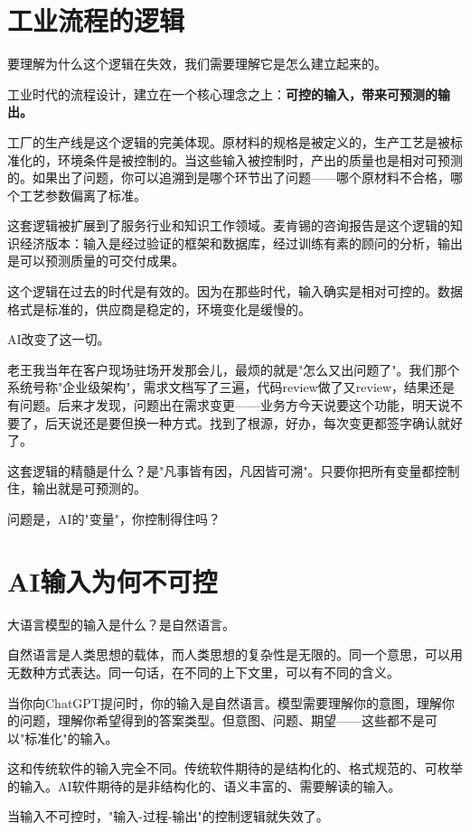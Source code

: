 \section{工业流程的逻辑}


要理解为什么这个逻辑在失效，我们需要理解它是怎么建立起来的。

工业时代的流程设计，建立在一个核心理念之上：\textbf{可控的输入，带来可预测的输出。}

工厂的生产线是这个逻辑的完美体现。原材料的规格是被定义的，生产工艺是被标准化的，环境条件是被控制的。当这些输入被控制时，产出的质量也是相对可预测的。如果出了问题，你可以追溯到是哪个环节出了问题——哪个原材料不合格，哪个工艺参数偏离了标准。

这套逻辑被扩展到了服务行业和知识工作领域。麦肯锡的咨询报告是这个逻辑的知识经济版本：输入是经过验证的框架和数据库，经过训练有素的顾问的分析，输出是可以预测质量的可交付成果。

这个逻辑在过去的时代是有效的。因为在那些时代，输入确实是相对可控的。数据格式是标准的，供应商是稳定的，环境变化是缓慢的。

AI改变了这一切。

老王我当年在客户现场驻场开发那会儿，最烦的就是"怎么又出问题了"。我们那个系统号称"企业级架构"，需求文档写了三遍，代码review做了又review，结果还是有问题。后来才发现，问题出在需求变更——业务方今天说要这个功能，明天说不要了，后天说还是要但换一种方式。找到了根源，好办，每次变更都签字确认就好了。

这套逻辑的精髓是什么？是"凡事皆有因，凡因皆可溯"。只要你把所有变量都控制住，输出就是可预测的。

问题是，AI的"变量"，你控制得住吗？

\section{AI输入为何不可控}


大语言模型的输入是什么？是自然语言。

自然语言是人类思想的载体，而人类思想的复杂性是无限的。同一个意思，可以用无数种方式表达。同一句话，在不同的上下文里，可以有不同的含义。

当你向ChatGPT提问时，你的输入是自然语言。模型需要理解你的意图，理解你的问题，理解你希望得到的答案类型。但意图、问题、期望——这些都不是可以"标准化"的输入。

这和传统软件的输入完全不同。传统软件期待的是结构化的、格式规范的、可枚举的输入。AI软件期待的是非结构化的、语义丰富的、需要解读的输入。

当输入不可控时，"输入-过程-输出"的控制逻辑就失效了。

